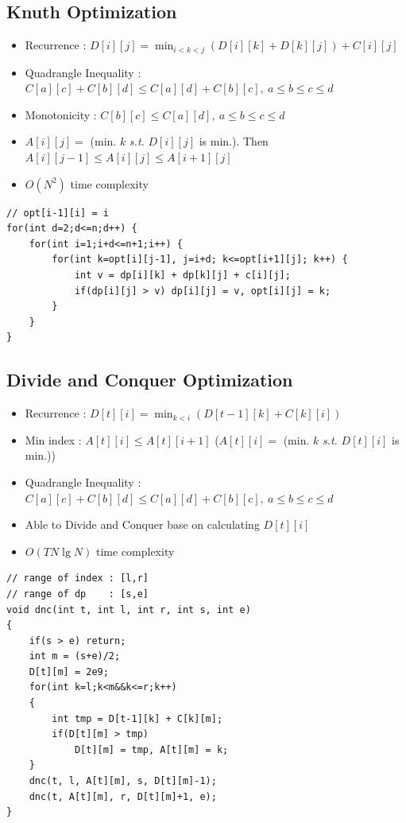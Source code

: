 \documentclass[landscape, 8pt, a4paper, oneside, twocolumn]{extarticle}
\begin{document}
\subsection{Knuth Optimization}
\begin{itemize}
\item Recurrence : $ D[i][j] = \min_{i<k<j}(D[i][k] + D[k][j]) + C[i][j]$
\item Quadrangle Inequality : $ C[a][c] + C[b][d] \leq C[a][d] + C[b][c],\ a \leq b \leq c \leq d$
\item Monotonicity : $ C[b][c] \leq C[a][d],\ a \leq b \leq c \leq d$
\item $ A[i][j] = $ (min. $ k $ \textit{s.t.} $ D[i][j] $ is min.). Then $ A[i][j-1] \leq A[i][j] \leq A[i+1][j]$
\item $ O(N^2) $ time complexity
\end{itemize}
\begin{verbatim}
// opt[i-1][i] = i
for(int d=2;d<=n;d++) {
    for(int i=1;i+d<=n+1;i++) {
        for(int k=opt[i][j-1], j=i+d; k<=opt[i+1][j]; k++) {
            int v = dp[i][k] + dp[k][j] + c[i][j];
            if(dp[i][j] > v) dp[i][j] = v, opt[i][j] = k;
        }
    }
}
\end{verbatim}

\subsection{Divide and Conquer Optimization}
\begin{itemize}
\item Recurrence : $ D[t][i] = \min_{k<i} (D[t-1][k] + C[k][i]) $
\item Min index : $ A[t][i] \leq A[t][i+1] $ ($ A[t][i] = $ (min. $ k $ \textit{s.t.} $ D[t][i] $ is min.))
\item Quadrangle Inequality : $ C[a][c] + C[b][d] \leq C[a][d] + C[b][c],\ a \leq b \leq c \leq d$
\item Able to Divide and Conquer base on calculating $ D[t][i] $
\item $ O(T N \lg N) $ time complexity
\end{itemize}
\begin{verbatim}
// range of index : [l,r]
// range of dp    : [s,e]
void dnc(int t, int l, int r, int s, int e)
{
    if(s > e) return;
    int m = (s+e)/2;
    D[t][m] = 2e9;
    for(int k=l;k<m&&k<=r;k++)
    {
        int tmp = D[t-1][k] + C[k][m];
        if(D[t][m] > tmp)
            D[t][m] = tmp, A[t][m] = k;
    }
    dnc(t, l, A[t][m], s, D[t][m]-1);
    dnc(t, A[t][m], r, D[t][m]+1, e);
}
\end{verbatim}
\end{document}
